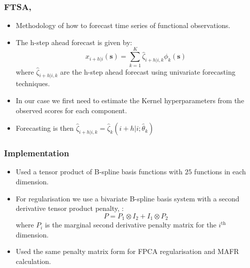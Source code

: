 \documentclass[aspectratio=169]{beamer}
\newcommand{\ve}[1]{\bm{{#1}}}
\begin{document}
  \begin{frame}
    \frametitle{FTSA, \cite{shang_ftsa_2013}}
    \begin{itemize}
      \item Methodology of how to forecast time series of functional observations.
      \item The h-step ahead forecast is given by:
        \begin{equation}
          x_{i+h | i} (\ve{s}) = \sum_{k=1}^{K} \hat{\zeta}_{i+h|i, k} \phi_k(\ve{s})
          \label{eqn:score_for}
        \end{equation}
        where $\hat{\zeta}_{i+h | i, k}$ are the h-step ahead forecast using univariate forecasting techniques. 
      \item In our case we first need to estimate the Kernel hyperparameters from the observed scores for each component. 
      \item Forecasting is then $\hat{\zeta}_{i+h | i, k} = \hat{\zeta}_k(i+h | i; \hat{\theta}_k)$ 
    \end{itemize}
  \end{frame}

  \begin{frame}
    \frametitle{Implementation}
    \begin{itemize}
      \item Used a tensor product of B-spline basis functions with $25$ functions in each dimension.
      \item For regularisation we use a bivariate B-spline basis system with a second derivative tensor product penalty, \cite{wood_low-rank_2006}:
        \begin{equation}
          P = P_1 \otimes I_2 + I_1 \otimes P_2 
          \label{eqn:reg}
        \end{equation}
        where $P_i$ is the marginal second derivative penalty matrix for the $i^\text{th}$ dimension.
      \item Used the same penalty matrix form for FPCA regularisation and MAFR calculation.   
    \end{itemize}
  \end{frame}
  
\end{document}
